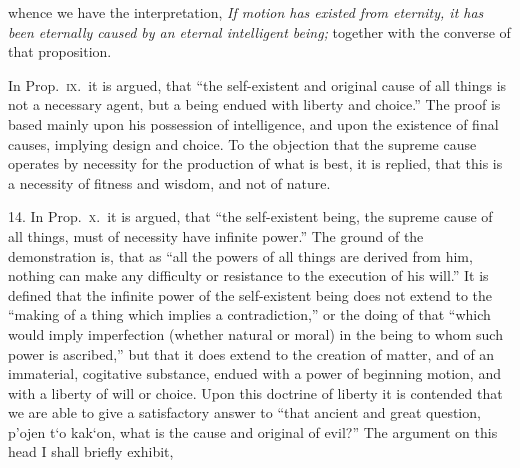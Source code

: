 \documentclass[oneside]{book}
\begin{document}

whence we have the interpretation, \emph{If motion has existed from
eternity, it has been eternally caused by an eternal intelligent being;}
together with the converse of that proposition.

In Prop.~\textsc{ix}.\ it is argued, that ``the self-existent and original
cause of all things is not a necessary agent, but a being endued
with liberty and choice.'' The proof is based mainly upon his
possession of intelligence, and upon the existence of final causes,
implying design and choice. To the objection that the supreme
cause operates by necessity for the production of what is best, it
is replied, that this is a necessity of fitness and wisdom, and not
of nature.

14. In Prop.~\textsc{x}.\ it is argued, that ``the self-existent being,
the supreme cause of all things, must of necessity have infinite
power.'' The ground of the demonstration is, that as ``all the
powers of all things are derived from him, nothing can make any
difficulty or resistance to the execution of his will.'' It is defined
that the infinite power of the self-existent being does not
extend to the ``making of a thing which implies a contradiction,''
or the doing of that ``which would imply imperfection (whether
natural or moral) in the being to whom such power is ascribed,''
but that it does extend to the creation of matter, and of an immaterial,
cogitative substance, endued with a power of beginning
motion, and with a liberty of will or choice. Upon this doctrine
of liberty it is contended that we are able to give a satisfactory
answer to ``that ancient and great question, \textgreek{p'ojen t`o kak`on},
what is the cause and original of evil?'' The argument on this
head I shall briefly exhibit,
\end{document}

